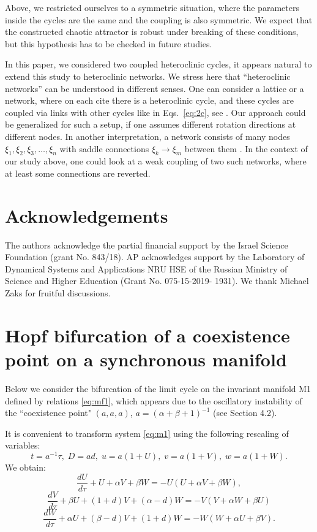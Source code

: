\documentclass[3p,number,review,sort&compress]{elsarticle}
\begin{document}
Above, we restricted ourselves to a symmetric situation, where
the parameters inside the cycles are the same and the coupling is also symmetric. We expect that the constructed chaotic attractor is robust under breaking of these conditions, but this hypothesis has to be checked in future studies. 

In this paper, we considered two coupled heteroclinic cycles, it appears natural
to extend this study to heteroclinic networks. We stress here that ``heteroclinic networks'' can be understood in different senses. One can consider a lattice or a network, where on each cite there is a heteroclinic cycle, and these cycles are coupled via links with other cycles like in Eqs.~\eqref{eq:2c}, see \cite{10.1143/PTP.109.133}. Our approach could be
generalized for such a setup, if one assumes different rotation directions at different nodes. In another interpretation,
a network consists of many nodes $\xi_1,\xi_2,\xi_3,\ldots,\xi_n$ with saddle connections $\xi_k\to\xi_m$ between them \cite{ashwin2020almost}. In the context of our study above, one could look at a weak coupling of two such networks, where at least some connections are reverted.

\section*{Acknowledgements}
The authors acknowledge the partial financial support by the Israel Science Foundation (grant No. 843/18).
AP acknowledges support by the Laboratory
of Dynamical Systems and Applications NRU HSE of the Russian
Ministry of Science and Higher Education (Grant No. 075-15-2019-
1931).
We thank Michael Zaks for fruitful discussions.

\appendix
\section{Hopf bifurcation of a coexistence point on a synchronous manifold}
\label{sec:hbif}
Below we consider the bifurcation of the limit cycle on the invariant manifold M1 defined by relations \eqref{eq:mf1}, which appears due to the oscillatory instability of the ``coexistence point" $(a,a,a)$, $a=(\alpha+\beta+1)^{-1}$ (see Section 4.2).

It is convenient to transform system \eqref{eq:m1} using the following rescaling of variables:
$$t=a^{-1}\tau,\;D=ad,\;u=a(1+U),\;v=a(1+V),\;w=a(1+W).$$
We obtain:
$$\frac{dU}{d\tau}+U+\alpha V+\beta W=-U(U+\alpha V+\beta W),$$
\begin{equation}
    \frac{dV}{d\tau}+\beta U+(1+d)V+(\alpha-d)W=-V(V+\alpha W+\beta U)
    \label{eqapp1}
\end{equation}
    $$\frac{dW}{d\tau}+\alpha U+(\beta-d)V+(1+d)W=-W(W+\alpha U+\beta V).$$
\end{document}
